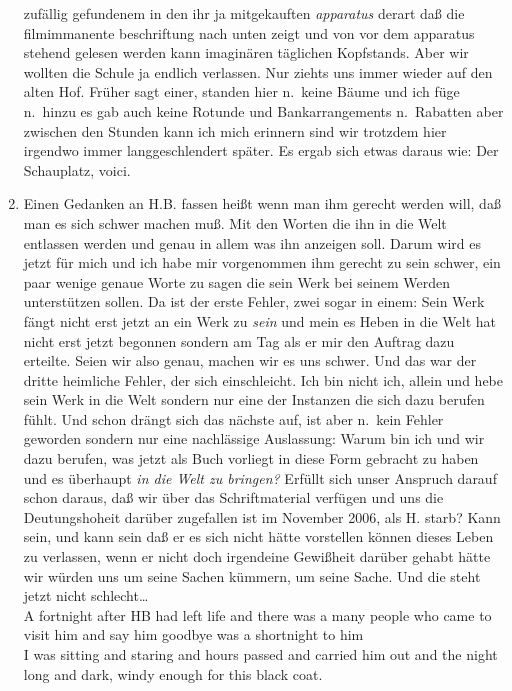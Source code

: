\documentclass[
]{article}
\begin{document}
\begin{enumerate}
  zufällig gefundenem in den ihr ja mitgekauften \emph{apparatus} derart
  daß die filmimmanente beschriftung nach unten zeigt und von vor dem
  apparatus stehend gelesen werden kann imaginären täglichen Kopfstands.
  Aber wir wollten die Schule ja endlich verlassen. Nur ziehts uns immer
  wieder auf den alten Hof. Früher sagt einer, standen hier n.~keine
  Bäume und ich füge n.~hinzu es gab auch keine Rotunde und
  Bankarrangements n.~Rabatten aber zwischen den Stunden kann ich mich
  erinnern sind wir trotzdem hier irgendwo immer langgeschlendert
  später. Es ergab sich etwas daraus wie: Der Schauplatz, voici.\\
\item
  Einen Gedanken an H.B. fassen heißt wenn man ihm gerecht werden will,
  daß man es sich schwer machen muß. Mit den Worten die ihn in die Welt
  entlassen werden und genau in allem was ihn anzeigen soll. Darum wird
  es jetzt für mich und ich habe mir vorgenommen ihm gerecht zu sein
  schwer, ein paar wenige genaue Worte zu sagen die sein Werk bei seinem
  Werden unterstützen sollen. Da ist der erste Fehler, zwei sogar in
  einem: Sein Werk fängt nicht erst jetzt an ein Werk zu \emph{sein }und
  mein es Heben in die Welt hat nicht erst jetzt begonnen sondern am Tag
  als er mir den Auftrag dazu erteilte. Seien wir also genau, machen wir
  es uns schwer. Und das war der dritte heimliche Fehler, der sich
  einschleicht. Ich bin nicht ich, allein und hebe sein Werk in die Welt
  sondern nur eine der Instanzen die sich dazu berufen fühlt. Und schon
  drängt sich das nächste auf, ist aber n.~kein Fehler geworden sondern
  nur eine nachlässige Auslassung: Warum bin ich und wir dazu berufen,
  was jetzt als Buch vorliegt in diese Form gebracht zu haben und es
  überhaupt \emph{in die Welt zu bringen?} Erfüllt sich unser Anspruch
  darauf schon daraus, daß wir über das Schriftmaterial verfügen und uns
  die Deutungshoheit darüber zugefallen ist im November 2006, als H.
  starb? Kann sein, und kann sein daß er es sich nicht hätte vorstellen
  können dieses Leben zu verlassen, wenn er nicht doch irgendeine
  Gewißheit darüber gehabt hätte wir würden uns um seine Sachen kümmern,
  um seine Sache. Und die steht jetzt nicht schlecht\ldots{}\\
  A fortnight after HB had left life and there was a many people who
  came to visit him and say him goodbye was a shortnight to him\\
  I was sitting and staring and hours passed and carried him out and the
  night long and dark, windy enough for this black coat.\\

\end{enumerate}
\end{document}
